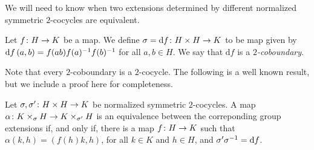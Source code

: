 We will need to know when two extensions determined by different normalized symmetric $2$-cocycles are equivalent.

\begin{defi}
    Let $f\colon H \to K$ be a map. 
    We define $\sigma  = \mathrm{d} f\colon H\times H \to K$ to be map given by $\mathrm{d} f\, (a,b) = f(ab)f(a)^{-1} f(b)^{-1}$ for all $a,b \in H$. 
    We say that $\mathrm{d} f$ is a \emph{$2$-coboundary}.
\end{defi}

Note that every $2$-coboundary is a $2$-cocycle. 
The following is a well known result, but we include a proof here for completeness.



\begin{prop}\label{prop:coboundary}
    Let $\sigma, \sigma' \colon H\times H \to K$ be normalized symmetric $2$-cocycles. 
    A map $\alpha\colon K \times_{\sigma} H \to K \times_{\sigma'} H$ is an equivalence between the correponding group extensions %
    if, and only if, there is a map $f\colon H \to K$ such that $\alpha(k,h) = (f(h) k, h)$, for all $k\in K$ and $h\in H$, and $\sigma' \sigma^{-1} = \mathrm{d} f$.
\end{prop}

